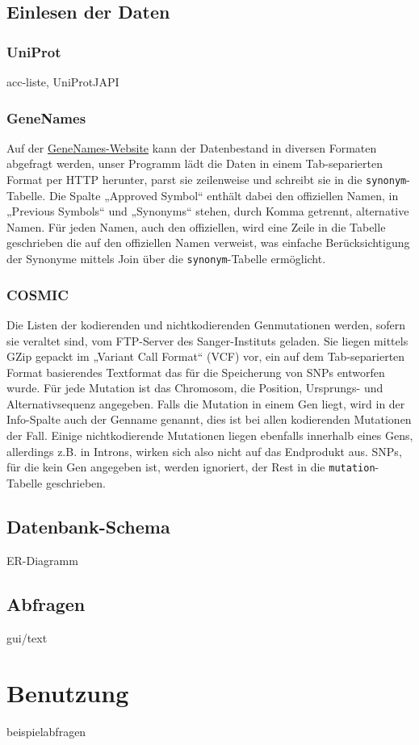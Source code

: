 \documentclass{scrartcl}
\begin{document}
\subsection{Einlesen der Daten}
\subsubsection{UniProt}
acc-liste, UniProtJAPI

\subsubsection{GeneNames}
Auf der \href{http://genenames.org/}{GeneNames-Website} kann der Datenbestand in diversen Formaten abgefragt werden, unser Programm lädt die Daten in einem Tab-separierten Format per HTTP herunter, parst sie zeilenweise und schreibt sie in die \texttt{synonym}-Tabelle. Die Spalte „Approved Symbol“ enthält dabei den offiziellen Namen, in „Previous Symbols“ und „Synonyms“ stehen, durch Komma getrennt, alternative Namen. Für jeden Namen, auch den offiziellen, wird eine Zeile in die Tabelle geschrieben die auf den offiziellen Namen verweist, was einfache Berücksichtigung der Synonyme mittels Join über die \texttt{synonym}-Tabelle ermöglicht.

\subsubsection{COSMIC}
Die Listen der kodierenden und nichtkodierenden Genmutationen werden, sofern sie veraltet sind, vom FTP-Server des Sanger-Instituts geladen. Sie liegen mittels GZip gepackt im „Variant Call Format“ (VCF) vor, ein auf dem Tab-separierten Format basierendes Textformat das für die Speicherung von SNPs entworfen wurde. Für jede Mutation ist das Chromosom, die Position, Ursprungs- und Alternativsequenz angegeben. Falls die Mutation in einem Gen liegt, wird in der Info-Spalte auch der Genname genannt, dies ist bei allen kodierenden Mutationen der Fall. Einige nichtkodierende Mutationen liegen ebenfalls innerhalb eines Gens, allerdings z.B. in Introns, wirken sich also nicht auf das Endprodukt aus. SNPs, für die kein Gen angegeben ist, werden ignoriert, der Rest in die \texttt{mutation}-Tabelle geschrieben.

\subsection{Datenbank-Schema}

ER-Diagramm

\subsection{Abfragen}

gui/text

\section{Benutzung}

beispielabfragen
\end{document}
